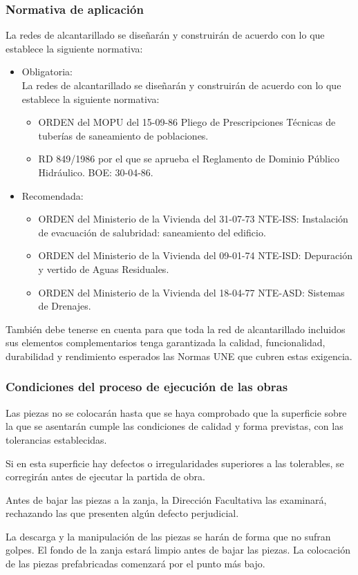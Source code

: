 \documentclass[../main.tex]{subfiles}
\begin{document}
\subsubsection{Normativa de aplicación}
La redes de alcantarillado se diseñarán y construirán de acuerdo con lo que establece la siguiente normativa:
\begin{itemize}
    \item Obligatoria: \\
    La redes de alcantarillado se diseñarán y construirán de acuerdo con lo que establece la siguiente normativa:
    \begin{itemize}
        \item ORDEN del MOPU del 15-09-86 Pliego de Prescripciones Técnicas de tuberías de saneamiento de poblaciones.
        \item RD 849/1986 por el que se aprueba el Reglamento de Dominio Público Hidráulico. BOE: 30-04-86.
    \end{itemize}
    \item Recomendada:
    \begin{itemize}
        \item ORDEN del Ministerio de la Vivienda del 31-07-73 NTE-ISS: Instalación de evacuación de salubridad: saneamiento del edificio.
        \item ORDEN del Ministerio de la Vivienda del 09-01-74 NTE-ISD: Depuración y vertido de Aguas Residuales.
        \item ORDEN del Ministerio de la Vivienda del 18-04-77 NTE-ASD: Sistemas de Drenajes.
    \end{itemize}
\end{itemize}
También debe tenerse en cuenta para que toda la red de alcantarillado incluidos sus elementos complementarios tenga garantizada la calidad, funcionalidad, durabilidad y rendimiento esperados las Normas UNE que cubren estas exigencia.

\subsubsection{Condiciones del proceso de ejecución de las obras}
Las piezas no se colocarán hasta que se haya comprobado que la superficie sobre la que se asentarán cumple las condiciones de calidad y forma previstas, con las tolerancias establecidas. \par
\vspace{0.5 cm}
Si en esta superficie hay defectos o irregularidades superiores a las tolerables, se corregirán antes de ejecutar la partida de obra. \par
\vspace{0.5 cm}
Antes de bajar las piezas a la zanja, la Dirección Facultativa las examinará, rechazando las que presenten algún defecto perjudicial. \par
\vspace{0.5 cm}
La descarga y la manipulación de las piezas se harán de forma que no sufran golpes. El fondo de la zanja estará limpio antes de bajar las piezas. La colocación de las piezas prefabricadas comenzará por el punto más bajo.
\end{document}
